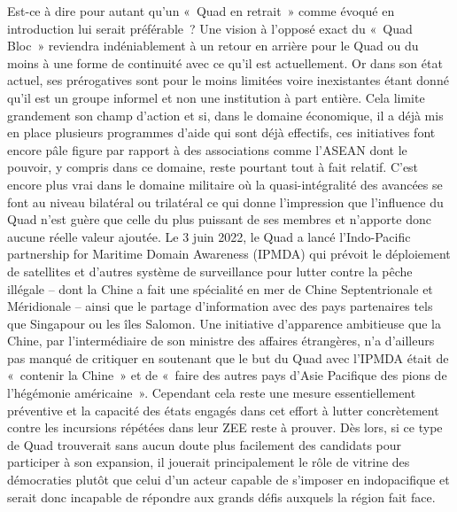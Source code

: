 \documentclass[11pt,a4paper]{article}
\begin{document}
Est-ce à dire pour autant qu'un «~Quad en retrait~» comme évoqué en introduction lui serait préférable~? Une vision à l'opposé exact du «~Quad Bloc~» reviendra indéniablement à un retour en arrière pour le Quad ou du moins à une forme de continuité avec ce qu'il est actuellement. Or dans son état actuel, ses prérogatives sont pour le moins limitées voire inexistantes étant donné qu'il est un groupe informel et non une institution à part entière. Cela limite grandement son champ d'action et si, dans le domaine économique, il a déjà mis en place plusieurs programmes d'aide qui sont déjà effectifs, ces initiatives font encore pâle figure par rapport à des associations comme l'ASEAN dont le pouvoir, y compris dans ce domaine, reste pourtant tout à fait relatif. C'est encore plus vrai dans le domaine militaire où la quasi-intégralité des avancées se font au niveau bilatéral ou trilatéral ce qui donne l'impression que l'influence du Quad n'est guère que celle du plus puissant de ses membres et n'apporte donc aucune réelle valeur ajoutée. Le 3 juin 2022, le Quad a lancé l'Indo-Pacific partnership for Maritime Domain Awareness (IPMDA) qui prévoit le déploiement de satellites et d'autres système de surveillance pour lutter contre la pêche illégale -- dont la Chine a fait une spécialité en mer de Chine Septentrionale et Méridionale -- ainsi que le partage d'information avec des pays partenaires tels que Singapour ou les îles Salomon. Une initiative d'apparence ambitieuse que la Chine, par l'intermédiaire de son ministre des affaires étrangères, n'a d'ailleurs pas manqué de critiquer en soutenant que le but du Quad avec l'IPMDA était de «~contenir la Chine~» et de «~faire des autres pays d'Asie Pacifique des pions de l'hégémonie américaine~». Cependant cela reste une mesure essentiellement préventive et la capacité des états engagés dans cet effort à lutter concrètement contre les incursions répétées dans leur ZEE reste à prouver. Dès lors, si ce type de Quad trouverait sans aucun doute plus facilement des candidats pour participer à son expansion, il jouerait principalement le rôle de vitrine des démocraties plutôt que celui d'un acteur capable de s'imposer en indopacifique et serait donc incapable de répondre aux grands défis auxquels la région fait face.
\end{document}
